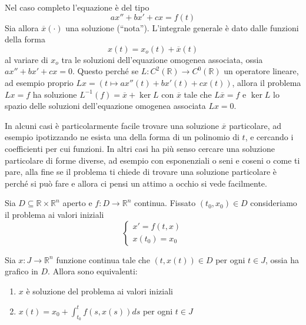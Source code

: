 \begin{example}
\begin{remark}
    Nel caso completo l'equazione è del tipo 
    \[
        ax'' + bx' + cx = f(t)
    \]
    Sia allora \(\overline{x}(\cdot )\) una soluzione (``nota''). L'integrale
    generale è dato dalle funzioni della forma 
    \[
        x(t) = x_{o}(t) + \overline{x}(t)
    \]
    al variare di \(x_{o} \) tra le soluzioni dell'equazione omogenea associata,
    ossia \(ax'' + bx' + cx = 0\).
    Questo perché se \(L : C^{2}(\mathbb{R}) \to C^{0}(\mathbb{R})\) un
    operatore lineare, ad esempio proprio \(Lx = (t \mapsto ax''(t) + bx'(t) +
    cx(t))\), allora il problema \(Lx = f\)  ha soluzione \(L^{-1}(f) =
    \overline{x} + \ker L\) con \(\overline{x}\) tale che \(L\overline{x} = f\)
    e \(\ker L\) lo spazio delle soluzioni dell'equazione omogenea associata
    \(Lx = 0\).

    In alcuni casi è particolarmente facile trovare una soluzione
    \(\overline{x}\) particolare, ad esempio ipotizzando ne esista una della
    forma di un polinomio di \(t\), e cercando i coefficienti per cui funzioni.
    In altri casi ha più senso cercare una soluzione particolare di forme
    diverse, ad esempio con esponenziali o seni e coseni o come ti pare, alla
    fine se il problema ti chiede di trovare una soluzione particolare è perché
    si può fare e allora ci pensi un attimo a occhio si vede facilmente.
\end{remark}
\end{example}

Sia \(D \subseteq \mathbb{R} \times \mathbb{R}^{n} \) aperto e \(f : D \to
\mathbb{R}^{ n } \) continua. Fissato \((t_{0}, x_{0}) \in D\) consideriamo il
problema ai valori iniziali
\[
    \begin{cases}
        x' = f(t, x) \\
        x(t_{0}) = x_{0}
    \end{cases}
\]
\begin{proposition}\label{proposition:equivalenza_pvi}
    Sia \(x : J \to  \mathbb{R}^{n}\) funzione continua tale che \((t, x(t)) \in
    D\)  per ogni \(t \in J\), ossia ha grafico in \(D\).
    Allora sono equivalenti:
\begin{enumerate}[label = \alph*)]
    \item \(x\) è soluzione del problema ai valori iniziali
    \item \(\displaystyle x(t) = x_{0} + \int_{t_{0}}^{t} f(s, x(s)) ds\) per ogni \(t \in J\) 
\end{enumerate}
\end{proposition}

